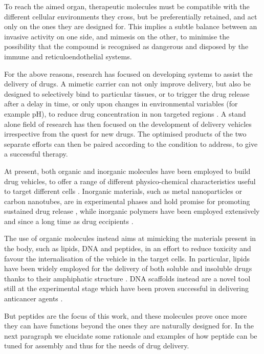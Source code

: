 To reach the aimed organ, therapeutic molecules must be compatible with the different cellular environments they cross, but be preferentially retained, and act only on the ones they are designed for. This implies a subtle balance between an invasive activity on one side, and mimesis on the other, to minimise the possibility that the compound is recognised as dangerous and disposed by the immune and reticuloendothelial systems.

For the above reasons, research has focused on developing systems to assist the delivery of drugs. A mimetic carrier can not only improve delivery, but also be designed to selectively bind to particular tissues, or to trigger the drug release after a delay in time, or only upon changes in environmental variables (for example pH), to reduce drug concentration in non targeted regions \cite{Pattni2015}. A stand alone field of research has then focused on the development of delivery vehicles irrespective from the quest for new drugs. The optimised products of the two separate efforts can then be paired according to the condition to address, to give a successful therapy.

At present, both organic and inorganic molecules have been employed to build drug vehicles, to offer a range of different physico-chemical characteristics useful to target different cells \citep{Hughes2005}. Inorganic materials, such as metal nanoparticles or carbon nanotubes, are in experimental phases and hold promise for promoting sustained drug release \citep{Boisselier2009,Depan2011}, while inorganic polymers have been employed extensively and since a long time as drug eccipients \citep{Lammers2009,Liechty2010,Nicolas2013}.

The use of organic molecules instead aims at mimicking the materials present in the body, such as lipids, DNA and peptides, in an effort to reduce toxicity and favour the internalisation of the vehicle in the target cells. In particular, lipids have been widely employed for the delivery of both soluble and insoluble drugs thanks to their amphiphatic structure \citep{Pattni2015paper,Jain2017,Yingchoncharoen2016,Bunker2016}. DNA scaffolds instead are a novel tool still at the experimental stage which have been proven successful in delivering anticancer agents \citep{Zhang2014, Jiang2012}. 

But peptides are the focus of this work, and these molecules prove once more they can have functions beyond the ones they are naturally designed for. In the next paragraph we elucidate some rationale and examples of how peptide can be tuned for assembly and thus for the needs of drug delivery.


